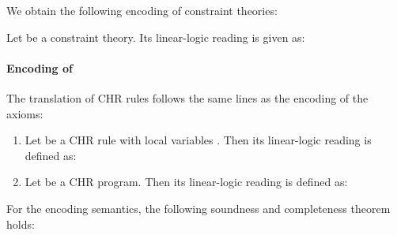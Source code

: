 \documentclass[acmtocl]{acmtrans2m}
\begin{document}
We obtain the following encoding of constraint theories:
\begin{definition}[()]
\label{def:ct-l}
Let  be a constraint theory. Its linear-logic reading  is given
as:

\end{definition}
\paragraph*{Encoding of } The translation of CHR rules follows the same
lines as the encoding of the  axioms:
\begin{definition}[()]
\label{def:rp-l}
\begin{enumerate}
\item \label{def:rp-l:r-l} Let  be a CHR rule with local variables . Then its linear-logic reading  is defined as:

\item \label{def:rp-l:p-l} Let  be a CHR program. Then
its linear-logic
reading  is defined as:

\end{enumerate}
\end{definition}

For the encoding semantics, the following soundness and completeness theorem
holds:
\end{document}
